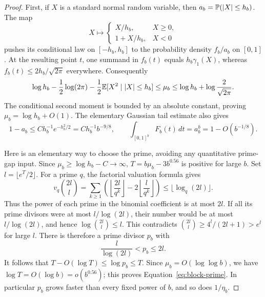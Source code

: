 \begin{proof}
First, if $X$ is a standard normal random variable, then
$a_b=\mathbb P(|X|\le h_b)$.  The map
\[
 X\longmapsto
 \begin{cases}
 X/h_b,&X\ge0,\\
 1+X/h_b,&X<0
 \end{cases}
\]
pushes its conditional law on $[-h_b,h_b]$ to the probability density
$f_b/a_b$ on $[0,1]$.  At the resulting point $t$, one summand in
$f_b(t)$ equals $h_b\gamma_1(X)$, whereas
$f_b(t)\le2h_b/\sqrt{2\pi}$ everywhere.  Consequently
\[
 \log h_b-\frac12\log(2\pi)
       -\frac12\mathbb E[X^2\mid |X|\le h_b]
 \le\mu_b\le\log h_b+\log\frac2{\sqrt{2\pi}}.
\]
The conditional second moment is bounded by an absolute constant, proving
$\mu_b=\log h_b+O(1)$.  The elementary Gaussian tail estimate also gives
\begin{equation}
 1-a_b\le C h_b^{-1}e^{-h_b^2/2}
       =C h_b^{-1}b^{-9/8},\qquad
 \int_{[0,1]^b}F_b(t)\,dt=a_b^b=1-O(b^{-1/8}).
 \label{eq:folded-total-mass}
\end{equation}

Here is an elementary way to choose the prime, avoiding any quantitative
prime-gap input.  Since $\mu_b\ge\log h_b-C\to\infty$,
$T=b\mu_b-3b^{0.56}$ is positive for large $b$.  Set
$l=\lfloor e^T/2\rfloor$.  For a prime $q$, the factorial valuation formula
gives
\[
 v_q\binom{2l}{l}
  =\sum_{k\ge1}\left(\left\lfloor\frac{2l}{q^k}\right\rfloor
                -2\left\lfloor\frac l{q^k}\right\rfloor\right)
  \le\lfloor\log_q(2l)\rfloor.
\]
Thus the power of each prime in the binomial coefficient is at most $2l$.
If all its prime divisors were at most $l/\log(2l)$, their number would be
at most $l/\log(2l)$, and hence
$\log\binom{2l}{l}\le l$.  This contradicts
$\binom{2l}{l}\ge4^l/(2l+1)>e^l$ for large $l$.
There is therefore a prime divisor $p_b$ with
\[
 \frac l{\log(2l)}<p_b\le2l.
\]
It follows that $T-O(\log T)\le\log p_b\le T$.  Since
$\mu_b=O(\log\log b)$, we have $\log T=O(\log b)=o(b^{0.56})$;
this proves Equation~\eqref{eq:block-prime}.  In particular $p_b$ grows
faster than every fixed power of $b$, and so does $1/\eta_b$.


\end{proof}
